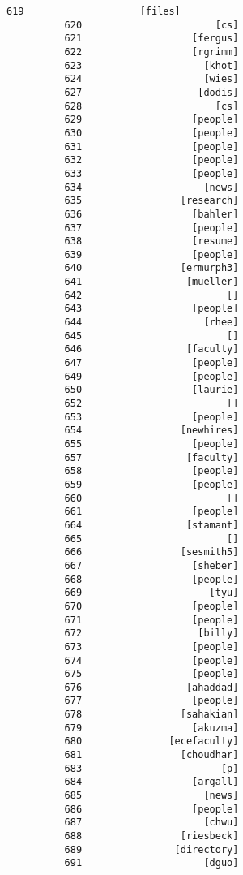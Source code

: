 \documentclass[11pt]{article}
\begin{document}
\begin{Verbatim}[commandchars=\\\{\}]
          619                    [files]
          620                       [cs]
          621                   [fergus]
          622                   [rgrimm]
          623                     [khot]
          624                     [wies]
          627                    [dodis]
          628                       [cs]
          629                   [people]
          630                   [people]
          631                   [people]
          632                   [people]
          633                   [people]
          634                     [news]
          635                 [research]
          636                   [bahler]
          637                   [people]
          638                   [resume]
          639                   [people]
          640                 [ermurph3]
          641                  [mueller]
          642                         []
          643                   [people]
          644                     [rhee]
          645                         []
          646                  [faculty]
          647                   [people]
          649                   [people]
          650                   [laurie]
          652                         []
          653                   [people]
          654                 [newhires]
          655                   [people]
          657                  [faculty]
          658                   [people]
          659                   [people]
          660                         []
          661                   [people]
          664                  [stamant]
          665                         []
          666                 [sesmith5]
          667                   [sheber]
          668                   [people]
          669                      [tyu]
          670                   [people]
          671                   [people]
          672                    [billy]
          673                   [people]
          674                   [people]
          675                   [people]
          676                  [ahaddad]
          677                   [people]
          678                 [sahakian]
          679                   [akuzma]
          680               [ecefaculty]
          681                 [choudhar]
          683                        [p]
          684                   [argall]
          685                     [news]
          686                   [people]
          687                     [chwu]
          688                 [riesbeck]
          689                [directory]
          691                     [dguo]

\end{Verbatim}
\end{document}
